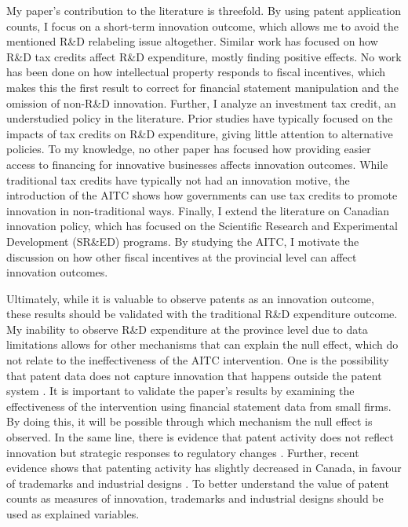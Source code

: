 \documentclass[../main.tex]{subfiles}
\begin{document}
My paper's contribution to the literature is threefold. By using patent application counts, I focus on a short-term innovation outcome, which allows me to avoid the mentioned R\&D relabeling issue altogether. Similar work has focused on how R\&D tax credits affect R\&D expenditure, mostly finding positive effects. No work has been done on how intellectual property responds to fiscal incentives, which makes this the first result to correct for financial statement manipulation and the omission of non-R\&D innovation. Further, I analyze an investment tax credit, an understudied policy in the literature. Prior studies have typically focused on the impacts of tax credits on R\&D expenditure, giving little attention to alternative policies. To my knowledge, no other paper has focused how providing easier access to financing for innovative businesses affects innovation outcomes. While traditional tax credits have typically not had an innovation motive, the introduction of the AITC shows how governments can use tax credits to promote innovation in non-traditional ways. Finally, I extend the literature on Canadian innovation policy, which has focused on the Scientific Research and Experimental Development (SR\&ED) programs. By studying the AITC, I motivate the discussion on how other fiscal incentives at the provincial level can affect innovation outcomes.

Ultimately, while it is valuable to observe patents as an innovation outcome, these results should be validated with the traditional R\&D expenditure outcome. My inability to observe R\&D expenditure at the province level due to data limitations allows for other mechanisms that can explain the null effect, which do not relate to the ineffectiveness of the AITC intervention. One is the possibility that patent data does not capture innovation that happens outside the patent system \parencite{moser13}. It is important to validate the paper’s results by examining the effectiveness of the intervention using financial statement data from small firms. By doing this, it will be possible through which mechanism the null effect is observed. In the same line, there is evidence that patent activity does not reflect innovation but strategic responses to regulatory changes \parencite{graham_mowrey04}. Further, recent evidence shows that patenting activity has slightly decreased in Canada, in favour of trademarks and industrial designs \parencite{canadianintellectualpropertyoffice22}. To better understand the value of patent counts as measures of innovation, trademarks and industrial designs should be used as explained variables. 
\end{document}
